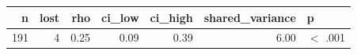 \begin{tabular}{rrrrrrl}
  \toprule
n & lost & rho & ci\_low & ci\_high & shared\_variance & p \\ 
  \midrule
191 &   4 & 0.25 & 0.09 & 0.39 & 6.00 & $<$ .001 \\ 
   \bottomrule
\end{tabular}
